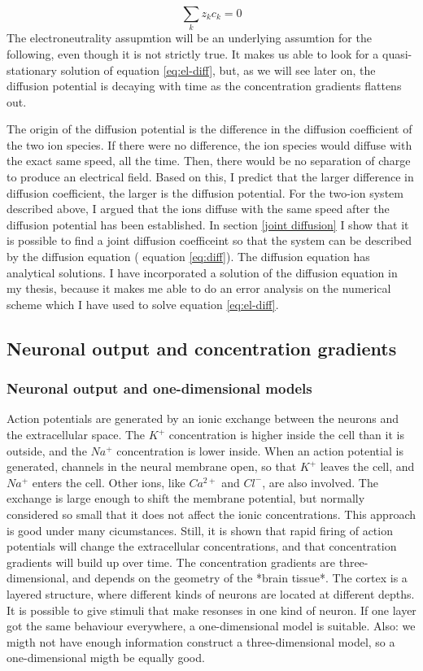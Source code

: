 \documentclass{article}
\begin{document}
$$\sum _k z_k c_k =0$$
The electroneutrality assupmtion will be an underlying assumtion for the following, even though it is not strictly true. It makes us able to look for a quasi-stationary solution of equation \ref{eq:el-diff}, but, as we will see later on, the diffusion potential is decaying with time as the concentration gradients flattens out. 



The origin of the diffusion potential is the difference in the diffusion coefficient of the two ion species. If there were no difference, the ion species would diffuse with the exact same speed, all the time. Then, there would be no separation of charge to produce an electrical field. Based on this, I predict that the larger difference in diffusion coefficient, the larger is the diffusion potential. For the two-ion system described above, I argued that the ions diffuse with the same speed after the diffusion potential has been established. In section \ref{joint diffusion} I show that  it is possible to find a joint diffusion coefficeint so that the system can be described by the diffusion equation ( equation  \ref{eq:diff}). The diffusion equation has analytical solutions. I have incorporated a solution of the diffusion equation in my thesis, because it makes me able to do an error analysis on the numerical scheme which I have used to solve   equation \ref{eq:el-diff}.



 


\subsection{Neuronal output and concentration gradients}
\subsubsection{Neuronal output and one-dimensional models}
Action potentials are generated by an ionic exchange between the neurons and the extracellular space. The $K^+$ concentration is higher inside the cell than it is outside, and the $Na^+$ concentration is lower inside. When an action potential is generated,  channels in the neural membrane open, so that $K^+$ leaves the cell, and $Na^+$ enters the cell. Other ions, like $Ca^{2+}$ and $Cl^-$, are also involved. The exchange is large enough to shift the membrane potential, but normally considered so small that it does not affect the ionic concentrations. This approach is good under many cicumstances. Still, it is shown that rapid firing of action potentials will change the extracellular concentrations, and that concentration gradients will build up over time. The concentration gradients are three-dimensional, and depends on the geometry of the *brain tissue*.  The cortex is a layered structure, where different kinds of neurons are located at different depths. It is possible to give stimuli that make resonses in one kind of neuron. If one layer got the same behaviour everywhere, a one-dimensional model is suitable. Also: we migth not have enough information construct a three-dimensional model, so a one-dimensional migth be equally good. 
\end{document}
